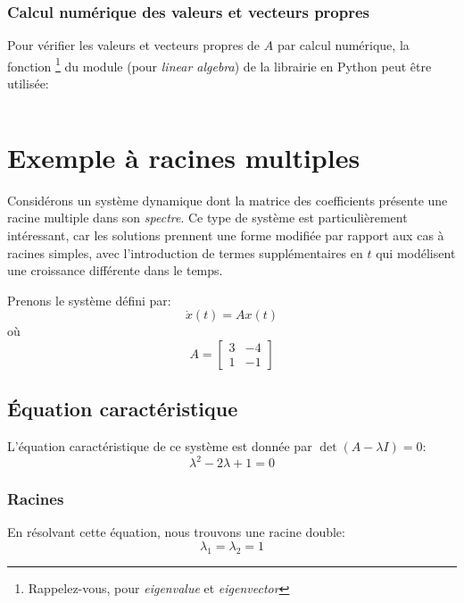             \subsubsection{Calcul numérique des valeurs et vecteurs propres}  
                Pour vérifier les valeurs et vecteurs propres de $A$ par calcul numérique, la fonction \footnote{Rappelez-vous, pour \textit{eigenvalue} et \textit{eigenvector}} du module  (pour \textit{linear algebra}) de la librairie  en Python peut être utilisée:
                \inputminted{python}{codes/complex_example.py}

    \section{Exemple à racines multiples}
        Considérons un système dynamique dont la matrice des coefficients présente une racine multiple dans son \textit{spectre}. Ce type de système est particulièrement intéressant, car les solutions prennent une forme modifiée par rapport aux cas à racines simples, avec l'introduction de termes supplémentaires en $t$ qui modélisent une croissance différente dans le temps.
        
        Prenons le système défini par:
        \begin{equation}
            \dot{x}(t)=A x(t)
        \end{equation}
        où
        \begin{equation}
            A=\begin{bmatrix} 3 & -4 \\ 1 & -1 \end{bmatrix}
        \end{equation}
        
        \subsection{Équation caractéristique}  
            L'équation caractéristique de ce système est donnée par $\det (A - \lambda I)=0$:
            \begin{equation}
                \lambda^2 - 2\lambda + 1=0
            \end{equation}
            
            \subsubsection{Racines}  
                En résolvant cette équation, nous trouvons une racine double:
                \begin{equation}
                    \lambda_1=\lambda_2=1
                \end{equation}
            
